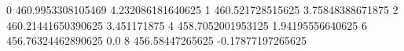 0 460.9953308105469 4.232086181640625
1 460.521728515625 3.75848388671875
2 460.21441650390625 3.451171875
4 458.7052001953125 1.94195556640625
6 456.76324462890625 0.0
8 456.58447265625 -0.17877197265625
